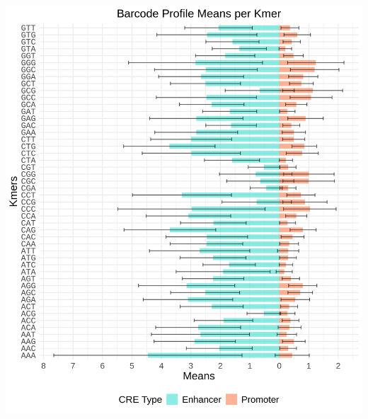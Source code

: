 \documentclass[
  letterpaper,
]{article}
\begin{document}
\begin{center}
\includegraphics{gb-test-pdf_files/figure-pdf/figure-prods-2.png}
\end{center}
\end{document}
